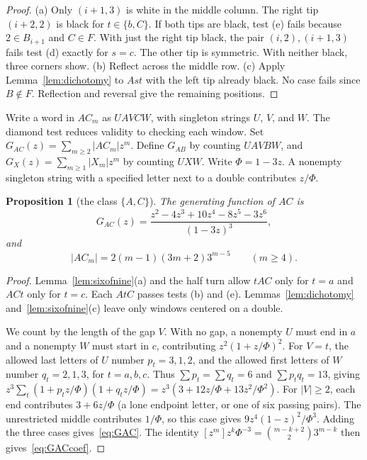 \documentclass[12pt]{article}
\theoremstyle{plain}
\newtheorem{proposition}[theorem]{Proposition}
\theoremstyle{definition}
\theoremstyle{remark}
\begin{document}
\begin{proof}
(a) Only $(i+1,3)$ is white in the middle column.
The right tip $(i+2,2)$ is black for $t\in\{b,C\}$.
If both tips are black, test (e) fails because $2\in B_{i+1}$ and $C\in F$.
With just the right tip black, the pair $(i,2),(i+1,3)$ fails test (d)
exactly for $s=c$. The other tip is symmetric. With neither black,
three corners show. (b) Reflect across the middle row.
(c) Apply Lemma~\ref{lem:dichotomy} to $Ast$ with the left tip
already black. No case fails since $B\notin F$.
Reflection and reversal give the remaining positions.
\end{proof}

Write a word in $AC_m$ as $UAVCW$, with singleton strings $U$, $V$,
and $W$. The diamond test reduces validity to checking each window.
Set $G_{AC}(z)=\sum_{m\ge2}|AC_m|z^m$. Define $G_{AB}$ by counting
$UAVBW$, and $G_X(z)=\sum_{m\ge1}|X_m|z^m$ by counting $UXW$.
Write $\Phi=1-3z$. A nonempty singleton string with a specified letter
next to a double contributes $z/\Phi$.

\begin{proposition}[the class $\{A,C\}$]\label{prop:threeGAC}
The generating function of $AC$ is
\begin{equation}\label{eq:GAC}
G_{AC}(z)=\frac{z^2-4z^3+10z^4-8z^5-3z^6}{(1-3z)^3},
\end{equation}
and
\begin{equation}\label{eq:GACcoef}
|AC_m|=2(m-1)(3m+2)3^{m-5}\qquad(m\ge4).
\end{equation}
\end{proposition}

\begin{proof}
Lemma~\ref{lem:sixofnine}(a) and the half turn allow $tAC$ only for
$t=a$ and $ACt$ only for $t=c$. Each $AtC$ passes tests (b) and (e).
Lemmas~\ref{lem:dichotomy} and~\ref{lem:sixofnine}(c) leave only
windows centered on a double.

We count by the length of the gap $V$. With no gap, a nonempty $U$ must end in
$a$ and a nonempty $W$ must start in $c$, contributing $z^2(1+z/\Phi)^2$.
For $V=t$, the allowed last letters of $U$ number $p_t=3,1,2$, and the
allowed first letters of $W$ number $q_t=2,1,3$, for $t=a,b,c$.
Thus $\sum p_t=\sum q_t=6$ and $\sum p_tq_t=13$, giving
$z^3\sum_t(1+p_tz/\Phi)(1+q_tz/\Phi)=z^3(3+12z/\Phi+13z^2/\Phi^2)$.
For $|V|\ge2$, each end contributes $3+6z/\Phi$ (a lone endpoint letter,
or one of six passing pairs). The unrestricted middle contributes
$1/\Phi$, so this case gives $9z^4(1-z)^2/\Phi^3$.
Adding the three cases gives~\eqref{eq:GAC}. The identity
$[z^m]z^k\Phi^{-3}=\binom{m-k+2}23^{m-k}$ then gives~\eqref{eq:GACcoef}.
\end{proof}
\end{document}
